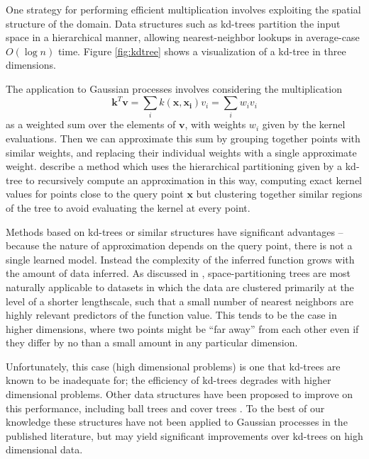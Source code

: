 \documentclass{article}
\begin{document}
One strategy for performing efficient multiplication involves exploiting the spatial structure of the domain. Data structures such as kd-trees partition the input space in a hierarchical manner, allowing nearest-neighbor lookups in average-case $O(\log n)$ time. Figure \ref{fig:kdtree} shows a visualization of a kd-tree in three dimensions.  

The application to Gaussian processes involves considering the multiplication 
\[\mathbf{k}^T \mathbf{v} = \sum_{i} k(\mathbf{x}, \mathbf{x_i})v_i = \sum_{i} w_iv_i\]
as a weighted sum over the elements of $\mathbf{v}$, with weights $w_i$ given by the kernel evaluations. Then we can approximate this sum by grouping together points with similar weights, and replacing their individual weights with a single approximate weight. \cite{shen2006fast} describe a method which uses the hierarchical partitioning given by a kd-tree to recursively compute an approximation in this way, computing exact kernel values for points close to the query point $\mathbf{x}$ but clustering together similar regions of the tree to avoid evaluating the kernel at every point. 

Methods based on kd-trees or similar structures have significant advantages -- because the nature of approximation depends on the query point, there is not a single learned model. Instead the complexity of the inferred function grows with the amount of data inferred. As discussed in \cite{murray2009gaussian}, space-partitioning trees are most naturally applicable to datasets in which the data are clustered primarily at the level of a shorter lengthscale, such that a small number of nearest neighbors are highly relevant predictors of the function value. This tends to be the case in higher dimensions, where two points might be ``far away'' from each other even if they differ by no than a small amount in any particular dimension. 

Unfortunately, this case (high dimensional problems) is one that kd-trees are known to be inadequate for; the efficiency of kd-trees degrades with higher dimensional problems. Other data structures have been proposed to improve on this performance, including ball trees \cite{omohundro1989five} and cover trees \cite{beygelzimer2006cover}. To the best of our knowledge these structures have not been applied to Gaussian processes in the published literature, but may yield significant improvements over kd-trees on high dimensional data. 
\end{document}
